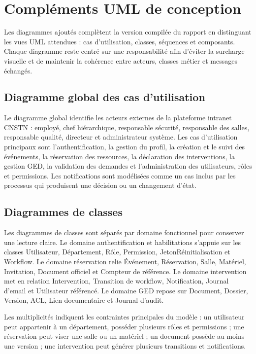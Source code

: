 \section{Compléments UML de conception}

Les diagrammes ajoutés complètent la version compilée du rapport en distinguant les vues UML attendues : cas d'utilisation, classes, séquences et composants. Chaque diagramme reste centré sur une responsabilité afin d'éviter la surcharge visuelle et de maintenir la cohérence entre acteurs, classes métier et messages échangés.

\subsection{Diagramme global des cas d'utilisation}

Le diagramme global identifie les acteurs externes de la plateforme intranet CNSTN : employé, chef hiérarchique, responsable sécurité, responsable des salles, responsable qualité, directeur et administrateur système. Les cas d'utilisation principaux sont l'authentification, la gestion du profil, la création et le suivi des événements, la réservation des ressources, la déclaration des interventions, la gestion GED, la validation des demandes et l'administration des utilisateurs, rôles et permissions. Les notifications sont modélisées comme un cas inclus par les processus qui produisent une décision ou un changement d'état.

\subsection{Diagrammes de classes}

Les diagrammes de classes sont séparés par domaine fonctionnel pour conserver une lecture claire. Le domaine authentification et habilitations s'appuie sur les classes Utilisateur, Département, Rôle, Permission, JetonRéinitialisation et Workflow. Le domaine réservation relie Événement, Réservation, Salle, Matériel, Invitation, Document officiel et Compteur de référence. Le domaine intervention met en relation Intervention, Transition de workflow, Notification, Journal d'email et Utilisateur référencé. Le domaine GED repose sur Document, Dossier, Version, ACL, Lien documentaire et Journal d'audit.

Les multiplicités indiquent les contraintes principales du modèle : un utilisateur peut appartenir à un département, posséder plusieurs rôles et permissions ; une réservation peut viser une salle ou un matériel ; un document possède au moins une version ; une intervention peut générer plusieurs transitions et notifications.

